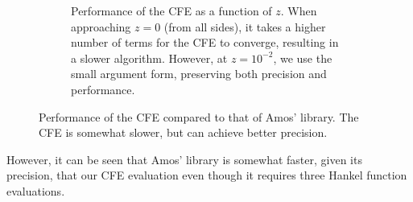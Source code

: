 \begin{figure}
\begin{subfigure}[t]{0.47\textwidth}
  \caption{Performance of the CFE as a function of $z$. When approaching
  $z=0$ (from all sides), it takes a higher number of terms for the 
  CFE to converge, resulting in a slower algorithm. However, at $z=10^{-2}$, we 
  use the small argument form, preserving both precision and performance.}
 \end{subfigure}
 \caption[Performance of the CFE compared to Amos' library's.]
	 {Performance of the CFE compared to that of Amos' library. The CFE is somewhat
	 slower, but can achieve better precision.}
\end{figure}


However, it can be seen that Amos' library is somewhat faster, given its
precision, that our CFE evaluation 
even though it requires three Hankel function evaluations. 





 \nocite{*}